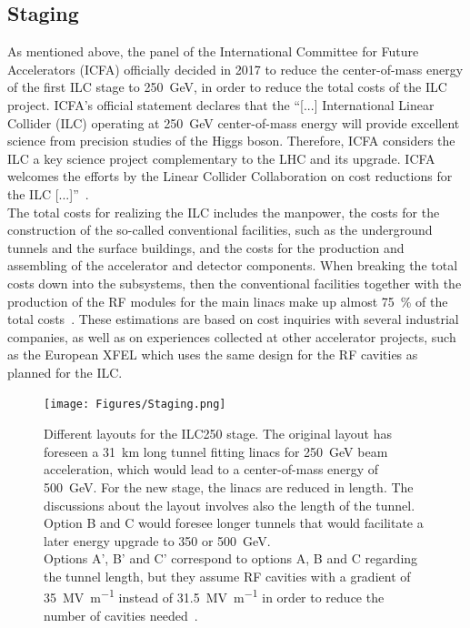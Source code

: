 \subsection{Staging}
\label{ILC:layout:staging}
As mentioned above, the panel of the International Committee for Future Accelerators (ICFA) officially decided in 2017 to reduce the center-of-mass energy of the first ILC stage to \SI{250}{\GeV}, in order to reduce the total costs of the ILC project.
ICFA's official statement declares that the ``[...] International Linear Collider (ILC) operating at \SI{250}{\GeV} center-of-mass energy will provide excellent science from precision studies of the Higgs boson.
Therefore, ICFA considers the ILC a key science project complementary to the LHC and its upgrade.
ICFA welcomes the efforts by the Linear Collider Collaboration on cost reductions for the ILC [...]''~\cite{ICFA_Statement}.\\
The total costs for realizing the ILC includes the manpower, the costs for the construction of the so-called conventional facilities, such as the underground tunnels and the surface buildings, and the costs for the production and assembling of the accelerator and detector components.
When breaking the total costs down into the subsystems, then the conventional facilities together with the production of the RF modules for the main linacs make up almost \SI{75}{\percent} of the total costs~\cite[p. 20f]{TDR1}.
These estimations are based on cost inquiries with several industrial companies, as well as on experiences collected at other accelerator projects, such as the European XFEL which uses the same design for the RF cavities as planned for the ILC.
\begin{figure}
\centering
\texttt{[image: Figures/Staging.png]}
\caption[Different layouts for the ILC250 stage]{Different layouts for the ILC250 stage.
The original layout has foreseen a \SI{31}{\kilo\meter} long tunnel fitting linacs for \SI{250}{\GeV} beam acceleration, which would lead to a center-of-mass energy of \SI{500}{\GeV}.
For the new stage, the linacs are reduced in length.
The discussions about the layout involves also the length of the tunnel.
Option B and C would foresee longer tunnels that would facilitate a later energy upgrade to 350 or \SI{500}{\GeV}.\\
Options A', B' and C' correspond to options A, B and C regarding the tunnel length, but they assume RF cavities with a gradient of \SI{35}{\mega\volt\per\meter} instead of \SI{31.5}{\mega\volt\per\meter} in order to reduce the number of cavities needed~\cite[p. 19]{Staging}.}
\label{fig:Staging}
\end{figure}
